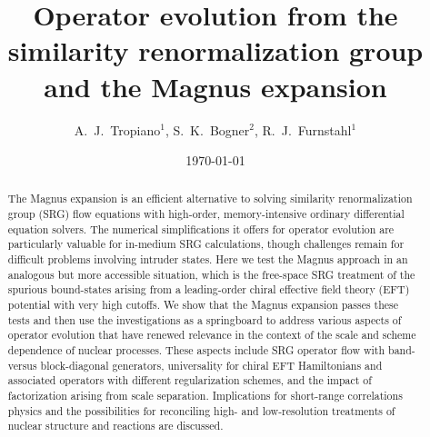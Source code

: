 \documentclass[10pt,aps,prc,floatfix,twocolumn,nofootinbib]{revtex4-1}
\begin{document}
\title{Operator evolution from the similarity renormalization group \texorpdfstring{\\}{}
and the Magnus expansion}


\author{A.~J.~Tropiano$^{1}$, S.~K.~Bogner$^{2}$, R.~J.~Furnstahl$^{1}$}


\date{\today}

\begin{abstract}
The Magnus expansion is an efficient alternative to solving similarity renormalization group (SRG) flow equations with high-order, memory-intensive ordinary differential equation solvers. The numerical simplifications it offers for operator evolution are particularly valuable for in-medium SRG calculations, though challenges remain for difficult problems involving intruder states. Here we test the Magnus approach in an analogous but more accessible situation, which is the free-space SRG treatment of the spurious bound-states arising from a leading-order chiral effective field theory (EFT) potential with very high cutoffs. We show that the Magnus expansion passes these tests and then use the investigations as a springboard to address various aspects of operator evolution that have renewed relevance in the context of the scale and scheme dependence of nuclear processes. These aspects include SRG operator flow with band- versus block-diagonal generators, universality for chiral EFT Hamiltonians and associated operators with different regularization schemes, and the impact of factorization arising from scale separation. Implications for short-range correlations physics and the possibilities for reconciling high- and low-resolution treatments of nuclear structure and reactions are discussed.
\end{abstract}

\maketitle

\newpage


\end{document}
